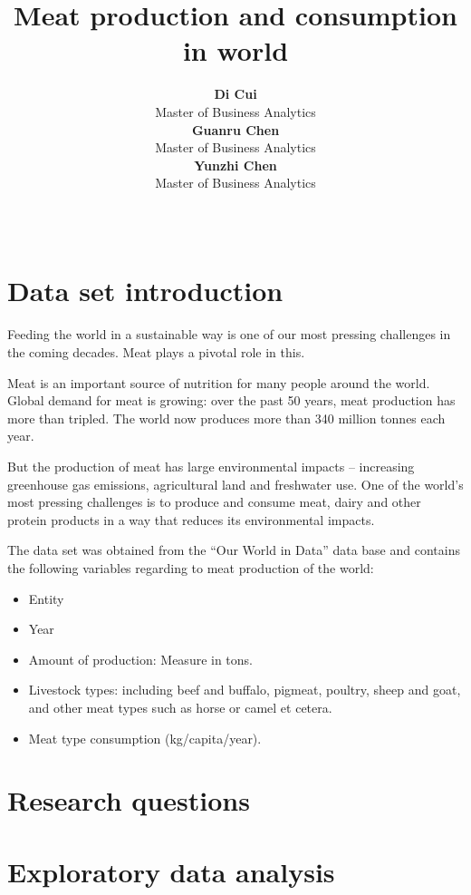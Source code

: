 \documentclass[11pt,a4paper,]{article}
\title{Meat production and consumption in world}
\author{\sf\Large\textbf{ Di Cui}\\ {\sf\large Master of Business Analytics\\[0.5cm]} \sf\Large\textbf{ Guanru Chen}\\ {\sf\large Master of Business Analytics\\[0.5cm]} \sf\Large\textbf{ Yunzhi Chen}\\ {\sf\large Master of Business Analytics\\[0.5cm]}}
\date{\sf\Date~\Month~\Year}
\makeatletter
\providecommand{\tightlist}{%
  \setlength{\itemsep}{0pt}\setlength{\parskip}{0pt}}
\def\titlepage{\front{\expandafter{\@title}}{\@author}{\@organization}}
\makeatother
\begin{document}
\titlepage

\hypertarget{data-set-introduction}{%
\section{Data set introduction}\label{data-set-introduction}}

Feeding the world in a sustainable way is one of our most pressing challenges in the coming decades. Meat plays a pivotal role in this.

Meat is an important source of nutrition for many people around the world. Global demand for meat is growing: over the past 50 years, meat production has more than tripled. The world now produces more than 340 million tonnes each year.

But the production of meat has large environmental impacts -- increasing greenhouse gas emissions, agricultural land and freshwater use. One of the world's most pressing challenges is to produce and consume meat, dairy and other protein products in a way that reduces its environmental impacts.

The data set was obtained from the ``Our World in Data'' data base and contains the following variables regarding to meat production of the world:

\begin{itemize}
\tightlist
\item
  Entity
\item
  Year
\item
  Amount of production: Measure in tons.
\item
  Livestock types: including beef and buffalo, pigmeat, poultry, sheep and goat, and other meat types such as horse or camel et cetera.
\item
  Meat type consumption (kg/capita/year).
\end{itemize}

\hypertarget{research-questions}{%
\section{Research questions}\label{research-questions}}

\clearpage

\hypertarget{exploratory-data-analysis}{%
\section{Exploratory data analysis}\label{exploratory-data-analysis}}
\end{document}

